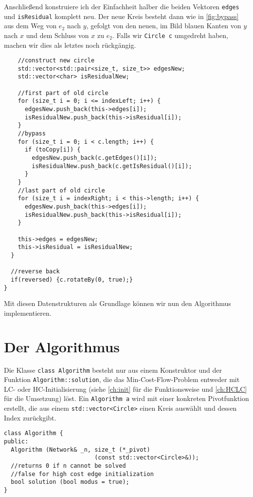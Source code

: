 Anschließend konstruiere ich der Einfachheit halber die beiden Vektoren \lstinline|edges| und \lstinline|isResidual| komplett neu. Der neue Kreis besteht dann wie in \cref{fig:bypass} aus dem Weg von $e_2$ nach $y$, gefolgt von den neuen, im Bild blauen Kanten von $y$ nach $x$ und dem Schluss von $x$ zu $e_2$. Falls wir \lstinline|Circle c| umgedreht haben, machen wir dies als letztes noch rückgängig.
    
\begin{lstlisting}
    //construct new circle
    std::vector<std::pair<size_t, size_t>> edgesNew;
    std::vector<char> isResidualNew;
    
    //first part of old circle
    for (size_t i = 0; i <= indexLeft; i++) {
      edgesNew.push_back(this->edges[i]);
      isResidualNew.push_back(this->isResidual[i]);
    }
    //bypass
    for (size_t i = 0; i < c.length; i++) {
      if (toCopy[i]) {
        edgesNew.push_back(c.getEdges()[i]);
        isResidualNew.push_back(c.getIsResidual()[i]);
      }
    }
    //last part of old circle
    for (size_t i = indexRight; i < this->length; i++) {
      edgesNew.push_back(this->edges[i]);
      isResidualNew.push_back(this->isResidual[i]);
    }
    
    this->edges = edgesNew;
    this->isResidual = isResidualNew;
  }

  //reverse back
  if(reversed) {c.rotateBy(0, true);}
}
\end{lstlisting}

Mit diesen Datenstrukturen als Grundlage können wir nun den Algorithmus implementieren.

\section{Der Algorithmus}
Die Klasse \lstinline|class Algorithm| besteht nur aus einem Konstruktor und der Funktion \lstinline|Algorithm::solution|, die das Min-Cost-Flow-Problem entweder mit LC- oder HC-Initialisierung (siehe \cref{ch:init} für die Funktionsweise und \cref{ch:HCLC} für die Umsetzung) löst. Ein \lstinline|Algorithm a| wird mit einer konkreten Pivotfunktion erstellt, die aus einem \lstinline|std::vector<Circle>| einen Kreis auswählt und dessen Index zurückgibt.
\begin{lstlisting}
class Algorithm {
public:
  Algorithm (Network& _n, size_t (*_pivot)
                          (const std::vector<Circle>&));
  //returns 0 if n cannot be solved
  //false for high cost edge initialization
  bool solution (bool modus = true);
}
\end{lstlisting}

